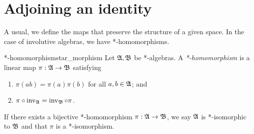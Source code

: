 \section{Adjoining an identity}
A usual, we define the maps that preserve the structure of a given space. In the case of involutive algebras, we have *-homomorphisms.
\begin{definition}{*-homomorphism}{star_morphism}
    Let \(\mathfrak{A}, \mathfrak{B}\) be *-algebras. A \emph{*-homomorphism} is a linear map \(\pi : \mathfrak{A} \to \mathfrak{B}\) satisfying
    \begin{enumerate}[label=(\alph*)]
        \item \(\pi(ab) = \pi(a) \pi(b)\) for all \(a, b \in \mathfrak{A}\); and
        \item \(\pi\circ \operatorname{inv}_{\mathfrak{A}} = \operatorname{inv}_{\mathfrak{B}}\circ \pi\).
    \end{enumerate}
    If there exists a bijective *-homomorphism \(\pi: \mathfrak{A} \to \mathfrak{B}\), we say \(\mathfrak{A}\) is *-isomorphic to \(\mathfrak{B}\) and that \(\pi\) is a *-isomorphism.
\end{definition}


